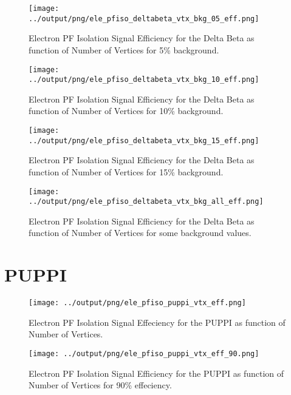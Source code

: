\documentclass[11pt]{book}
\begin{document}
\begin{figure}[htb]
\centering
\texttt{[image: ../output/png/ele\_pfiso\_deltabeta\_vtx\_bkg\_05\_eff.png]}
\caption{Electron PF Isolation Signal Efficiency for the Delta Beta as function of Number of Vertices for 5\% background.}
\label{fig:ele_pfiso_vtx_eff_deltabeta_bkg_05_eff}
\end{figure}

\begin{figure}[htb]
\centering
\texttt{[image: ../output/png/ele\_pfiso\_deltabeta\_vtx\_bkg\_10\_eff.png]}
\caption{Electron PF Isolation Signal Efficiency for the Delta Beta as function of Number of Vertices for 10\% background.}
\label{fig:ele_pfiso_vtx_eff_deltabeta_bkg_10_eff}
\end{figure}

\begin{figure}[htb]
\centering
\texttt{[image: ../output/png/ele\_pfiso\_deltabeta\_vtx\_bkg\_15\_eff.png]}
\caption{Electron PF Isolation Signal Efficiency for the Delta Beta as function of Number of Vertices for 15\% background.}
\label{fig:ele_pfiso_vtx_eff_deltabeta_bkg_15_eff}
\end{figure}

\begin{figure}[htb]
\centering
\texttt{[image: ../output/png/ele\_pfiso\_deltabeta\_vtx\_bkg\_all\_eff.png]}
\caption{Electron PF Isolation Signal Efficiency for the Delta Beta as function of Number of Vertices for some background values.}
\label{fig:ele_pfiso_vtx_eff_deltabeta_bkg_all_eff}
\end{figure}
\clearpage

\section{PUPPI}
\begin{figure}[htb]
\centering
\texttt{[image: ../output/png/ele\_pfiso\_puppi\_vtx\_eff.png]}
\caption{Electron PF Isolation Signal Effeciency for the PUPPI as function of Number of Vertices.}
\label{fig:ele_pfiso_vtx_eff_puppi}
\end{figure}

\begin{figure}[htb]
\centering
\texttt{[image: ../output/png/ele\_pfiso\_puppi\_vtx\_eff\_90.png]}
\caption{Electron PF Isolation Signal Efficiency for the PUPPI as function of Number of Vertices for 90\% effeciency.}
\label{fig:ele_pfiso_vtx_eff_puppi_eff_90}
\end{figure}
\end{document}
